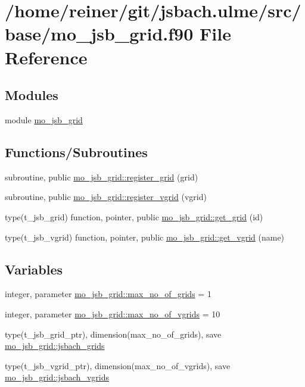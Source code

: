 \hypertarget{mo__jsb__grid_8f90}{}\section{/home/reiner/git/jsbach.ulme/src/base/mo\+\_\+jsb\+\_\+grid.f90 File Reference}
\label{mo__jsb__grid_8f90}
\subsection*{Modules}
\begin{DoxyCompactItemize}
\item 
module \hyperlink{namespacemo__jsb__grid}{mo\+\_\+jsb\+\_\+grid}
\end{DoxyCompactItemize}
\subsection*{Functions/\+Subroutines}
\begin{DoxyCompactItemize}
\item 
subroutine, public \hyperlink{namespacemo__jsb__grid_a7dc7b6b26aa0f0cce8b32e1f7f3307d6}{mo\+\_\+jsb\+\_\+grid\+::register\+\_\+grid} (grid)
\item 
subroutine, public \hyperlink{namespacemo__jsb__grid_a043909fe2d80d058e59831341f25fdab}{mo\+\_\+jsb\+\_\+grid\+::register\+\_\+vgrid} (vgrid)
\item 
type(t\+\_\+jsb\+\_\+grid) function, pointer, public \hyperlink{namespacemo__jsb__grid_ad009e7ddbafe2ef26506e2a5abdeb4db}{mo\+\_\+jsb\+\_\+grid\+::get\+\_\+grid} (id)
\item 
type(t\+\_\+jsb\+\_\+vgrid) function, pointer, public \hyperlink{namespacemo__jsb__grid_a2111791e291579cc1551a4213a670e35}{mo\+\_\+jsb\+\_\+grid\+::get\+\_\+vgrid} (name)
\end{DoxyCompactItemize}
\subsection*{Variables}
\begin{DoxyCompactItemize}
\item 
integer, parameter \hyperlink{namespacemo__jsb__grid_a1d86a8db41131c146df75f25afca96ed}{mo\+\_\+jsb\+\_\+grid\+::max\+\_\+no\+\_\+of\+\_\+grids} = 1
\item 
integer, parameter \hyperlink{namespacemo__jsb__grid_a9155254cdfdc8f5d4faab808185807d6}{mo\+\_\+jsb\+\_\+grid\+::max\+\_\+no\+\_\+of\+\_\+vgrids} = 10
\item 
type(t\+\_\+jsb\+\_\+grid\+\_\+ptr), dimension(max\+\_\+no\+\_\+of\+\_\+grids), save \hyperlink{namespacemo__jsb__grid_a575fc745dca08fbc468cfa38e731e25e}{mo\+\_\+jsb\+\_\+grid\+::jsbach\+\_\+grids}
\item 
type(t\+\_\+jsb\+\_\+vgrid\+\_\+ptr), dimension(max\+\_\+no\+\_\+of\+\_\+vgrids), save \hyperlink{namespacemo__jsb__grid_a861c396d0d03f42c064fa5ff78f7cc58}{mo\+\_\+jsb\+\_\+grid\+::jsbach\+\_\+vgrids}
\end{DoxyCompactItemize}

